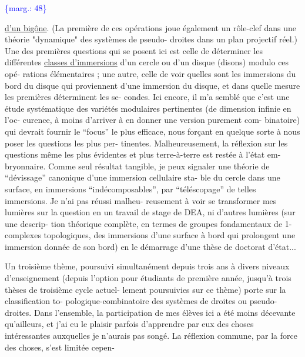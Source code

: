 \documentclass[11pt]{article}
\newcommand{\scanpage}[1]{\par\bigskip\noindent{\small\sffamily[scan #1]}\par}
\newcommand{\mspage}[1]{{\small\sffamily[p.\,#1]}}
\newcommand{\margin}[1]{\textcolor{blue}{\{\textsf{marg.:} #1\}}}
\newcommand{\uline}[1]{\underline{#1}}
\begin{document}
\margin{48}

\clearpage
\scanpage{119/49}
\mspage{47}

\uline{d'un bigône}. (La première de ces opérations joue également un
rôle-clef dans une théorie "dynamique" des systèmes de pseudo-%
droites dans un plan projectif réel.) Une des premières questions
qui se posent ici est celle de déterminer les différentes \uline{classes
d'immersions} d'un cercle ou d'un disque (disons) modulo ces opé-%
rations élémentaires ; une autre, celle de voir quelles sont les
immersions du bord du disque qui proviennent d'une immersion du
disque, et dans quelle mesure les premières déterminent les se-%
condes. Ici encore, il m'a semblé que c'est une étude systématique
des variétés modulaires pertinentes (de dimension infinie en l'oc-%
curence, à moins d'arriver à en donner une version purement com-%
binatoire) qui devrait fournir le ``focus'' le plus efficace, nous
forçant en quelque sorte à nous poser les questions les plus per-%
tinentes. Malheureusement, la réflexion sur les questions même
les plus évidentes et plus terre-à-terre est restée à l'état em-%
bryonnaire. Comme seul résultat tangible, je peux signaler une
théorie de ``dévissage'' canonique d'une immersion cellulaire sta-%
ble du cercle dans une surface, en immersions ``indécomposables'',
par ``téléscopage'' de telles immersions. Je n'ai pas réussi malheu-%
reusement à voir se transformer mes lumières sur la question en
un travail de stage de DEA, ni d'autres lumières (sur une descrip-%
tion théorique complète, en termes de groupes fondamentaux de
1-complexes topologiques, des immersions d'une surface à bord qui
prolongent une immersion donnée de son bord) en le démarrage d'une
thèse de doctorat d'état...

Un troisième thème, poursuivi simultanément depuis trois
ans à divers niveaux d'enseignement (depuis l'option pour étudiants
de première année, jusqu'à trois thèses de troisième cycle actuel-%
lement poursuivies sur ce thème) porte sur la classification to-%
pologique-combinatoire des systèmes de droites ou pseudo-droites.
Dans l'ensemble, la participation de mes élèves ici a été moins
décevante qu'ailleurs, et j'ai eu le plaisir parfois d'apprendre
par eux des choses intéressantes auxquelles je n'aurais pas songé.
La réflexion commune, par la force des choses, s'est limitée cepen-%
\end{document}
